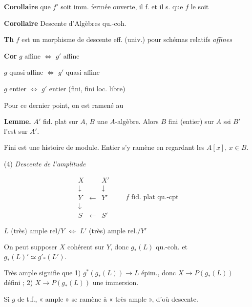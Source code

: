 \documentclass[11pt,a4paper]{article}
\begin{document}
\textbf{Corollaire}  que $f'$ soit imm. fermée  ouverte,  il f. et il s. que $f$ le soit \struck{\ill{}}

\textbf{Corollaire} Descente d'Algèbres qu.-coh.

 \textbf{Th}  \struck{\ill{}} $f$ est un morphisme de descente eff. (univ.) pour  schémas relatifs \emph{affines}

\textbf{Cor} $g$ \struck{\ill{}} affine $\Longleftrightarrow$ $g'$ affine

$g$ quasi-affine $\Longleftrightarrow$ $g'$ quasi-affine 

$g$ entier  $\Longleftrightarrow$ $g'$ entier (fini, fini loc. libre)


Pour ce dernier point, on est ramené au

\textbf{Lemme.} $A'$ fid. plat sur $A$, $B$ une $A$-algèbre. Alors $B$ fini (entier) sur $A$ ssi $B'$ l'est sur $A'$.

Fini est une histoire de module. Entier s'y ramène en regardant les $A[x]$, $x \in B$.

(4) \emph{Descente de l'amplitude}

\[
\begin{array}{ccc}
X & & X' \\
\downarrow & & \downarrow \\
Y & \longleftarrow & Y' \\
\downarrow & & \\
S & \longleftarrow & S'
\end{array}
\qquad f \text{ fid. plat qu.-cpt}
\]

$L$ (très) ample rel$/Y$ $\Longleftrightarrow$ $L'$ (très) ample rel.$/Y'$

On peut supposer $X$ cohérent sur $Y$, donc $g_*(L)$ qu.-coh. et $g_*(L)' \simeq g'_*(L')$.

Très ample signifie que 1) $g^*(g_*(L)) \to L$ épim., donc $X \to P(g_*(L))$ défini ; 2)  $X \to P(g_*(L))$ une immersion.

Si $g$ de t.f., « ample » se ramène à « très ample », d'où descente.
\end{document}
